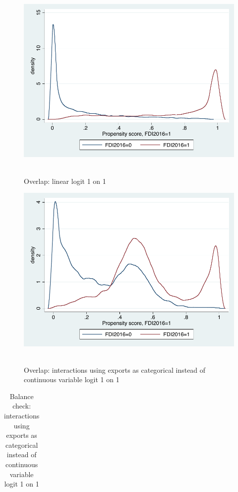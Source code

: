 \begin{figure}
	\centering
	\includegraphics[scale=0.6]{figures_and_tables/3_overlap_linearlogit1o1.pdf}\
	\caption{Overlap: linear logit 1 on 1 }
	\label{ol_linlog1}
\end{figure}

\begin{figure}
	\centering
	\includegraphics[scale=0.6]{figures_and_tables/3_overlap_intcatlogit1o1.pdf}\
	\caption{Overlap: interactions using exports as categorical instead of continuous variable logit 1 on 1 }
	\label{ol_intcatlog1}
\end{figure}

\begin{table}
	\centering
	\begin{tabular}{lcccc}
		\hline \hline
	
	\hline \hline
	\end{tabular}
	\caption{Balance check: interactions using exports as categorical instead of continuous variable logit 1 on 1}
	\label{bal_intcatlog1}
\end{table}

